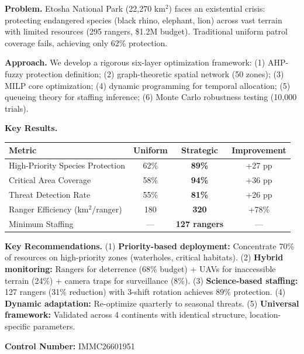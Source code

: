 \textbf{Problem.} Etosha National Park (22,270 km$^2$) faces an existential crisis: protecting endangered species (black rhino, elephant, lion) across vast terrain with limited resources (295 rangers, \$1.2M budget). Traditional uniform patrol coverage fails, achieving only 62\% protection.

\vspace{0.2cm}

\textbf{Approach.} We develop a rigorous six-layer optimization framework: (1) AHP-fuzzy protection definition; (2) graph-theoretic spatial network (50 zones); (3) MILP core optimization; (4) dynamic programming for temporal allocation; (5) queueing theory for staffing inference; (6) Monte Carlo robustness testing (10,000 trials).

\vspace{0.2cm}

\textbf{Key Results.}

\begin{table}[H]
\centering
\small
\begin{tabular}{lccc}
\toprule
\textbf{Metric} & \textbf{Uniform} & \textbf{Strategic} & \textbf{Improvement} \\
\midrule
High-Priority Species Protection & 62\% & \textbf{89\%} & +27 pp \\
Critical Area Coverage & 58\% & \textbf{94\%} & +36 pp \\
Threat Detection Rate & 55\% & \textbf{81\%} & +26 pp \\
Ranger Efficiency (km$^2$/ranger) & 180 & \textbf{320} & +78\% \\
Minimum Staffing & — & \textbf{127 rangers} & — \\
\bottomrule
\end{tabular}
\end{table}

\vspace{0.2cm}

\textbf{Key Recommendations.} (1) \textbf{Priority-based deployment:} Concentrate 70\% of resources on high-priority zones (waterholes, critical habitats). (2) \textbf{Hybrid monitoring:} Rangers for deterrence (68\% budget) + UAVs for inaccessible terrain (24\%) + camera traps for surveillance (8\%). (3) \textbf{Science-based staffing:} 127 rangers (31\% reduction) with 3-shift rotation achieves 89\% protection. (4) \textbf{Dynamic adaptation:} Re-optimize quarterly to seasonal threats. (5) \textbf{Universal framework:} Validated across 4 continents with identical structure, location-specific parameters.

\vspace{0.2cm}

\noindent \textbf{Control Number:} IMMC26601951
